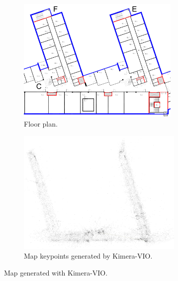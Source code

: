\documentclass[11pt, letterpaper, twoside]{article}
\begin{document}
\begin{figure}[tb]
    \centering
    \begin{subfigure}[t]{.49\textwidth}
        \centering
        \includegraphics[height=6cm]{corridor.png}
        \caption{Floor plan.}\label{fig:kimera_corridor}
    \end{subfigure}%
    \begin{subfigure}[t]{.49\textwidth}
        \centering
        \includegraphics[height=6cm]{kimera_result.png}
        \caption{%
            Map keypoints generated by Kimera-VIO.
        }\label{fig:kimera_result}
    \end{subfigure}%
    \caption{Map generated with Kimera-VIO.}\label{fig:kimera}
\end{figure}

\FloatBarrier{}


\end{document}
